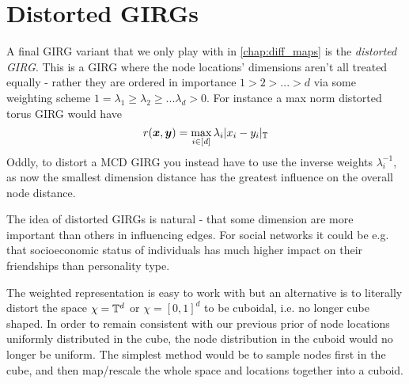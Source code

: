 \section{Distorted GIRGs}
\label{subsec:distorted_girgs}
A final GIRG variant that we only play with in \cref{chap:diff_maps} is the \textit{distorted GIRG}. This is a GIRG where the node locations' dimensions aren't all treated equally - rather they are ordered in importance $1 > 2 > ... > d$ via some weighting scheme $1=\lambda_1 \geq \lambda_2 \geq ... \lambda_d > 0$. For instance a max norm distorted torus GIRG would have
\begin{equation}
    r(\bm{x}, \bm{y}) = \max\limits_{i \in [d]} \lambda_i |x_i - y_i|_{\mathbb{T}}
\end{equation}
Oddly, to distort a MCD GIRG you instead have to use the inverse weights $\lambda_i^{-1}$, as now the smallest dimension distance has the greatest influence on the overall node distance.

The idea of distorted GIRGs is natural - that some dimension are more important than others in influencing edges. For social networks it could be e.g. that socioeconomic status of individuals has much higher impact on their friendships than personality type.

The weighted representation is easy to work with but an alternative is to literally distort the space $\chi = \mathbb{T}^d$ or $\chi = [0,1]^d$ to be cuboidal, i.e. no longer cube shaped. In order to remain consistent with our previous prior of node locations uniformly distributed in the cube, the node distribution in the cuboid would no longer be uniform. The simplest method would be to sample nodes first in the cube, and then map/rescale the whole space and locations together into a cuboid.





